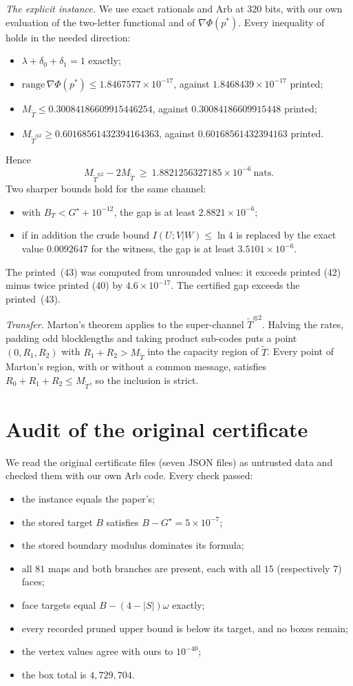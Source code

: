 \documentclass[11pt,draftclsnofoot,onecolumn,journal]{IEEEtran}
\begin{document}
\emph{The explicit instance.} We use exact rationals and Arb at 320 bits, with our own evaluation
of the two-letter functional and of $\nabla\Phi(p^*)$. Every inequality of~\cite[(30)--(43)]{HLL}
holds in the needed direction:
\begin{itemize}
\item $\lambda+\delta_0+\delta_1=1$ exactly;
\item $\mathrm{range}\,\nabla\Phi(p^*)\le1.8467577\times10^{-17}$, against
$1.8468439\times10^{-17}$ printed;
\item $M_{\tilde T}\le0.30084186609915446254$, against $0.30084186609915448$ printed;
\item $M_{\tilde T^{\otimes2}}\ge0.60168561432394164363$, against $0.60168561432394163$ printed.
\end{itemize}
Hence
\[
M_{\tilde T^{\otimes2}}-2M_{\tilde T}\ \ge\ 1.8821256327185\times10^{-6}\ \text{nats}.
\]
Two sharper bounds hold for the same channel:
\begin{itemize}
\item with $B_T<G^\star+10^{-12}$, the gap is at least $2.8821\times10^{-6}$;
\item if in addition the crude bound $I(U;V|W)\le\ln4$ is replaced by the exact value $0.0092647$
for the witness, the gap is at least $3.5101\times10^{-6}$.
\end{itemize}
The printed~(43) was computed from unrounded values: it exceeds printed (42) minus twice printed
(40) by $4.6\times10^{-17}$. The certified gap exceeds the printed~(43).

\emph{Transfer.} Marton's theorem applies to the super-channel $\tilde T^{\otimes2}$. Halving
the rates, padding odd blocklengths and taking product sub-codes puts a point $(0,R_1,R_2)$ with
$R_1+R_2>M_{\tilde T}$ into the capacity region of $\tilde T$. Every point of Marton's region,
with or without a common message, satisfies $R_0+R_1+R_2\le M_{\tilde T}$, so the inclusion is
strict.

\section{Audit of the original certificate}

We read the original certificate files (seven JSON files) as untrusted data and checked them
with our own Arb code. Every check passed:
\begin{itemize}
\item the instance equals the paper's;
\item the stored target $B$ satisfies $B-G^\star=5\times10^{-7}$;
\item the stored boundary modulus dominates its formula;
\item all $81$ maps and both branches are present, each with all $15$ (respectively $7$) faces;
\item face targets equal $B-(4-|S|)\omega$ exactly;
\item every recorded pruned upper bound is below its target, and no boxes remain;
\item the vertex values agree with ours to $10^{-40}$;
\item the box total is $4{,}729{,}704$.
\end{itemize}
\end{document}
